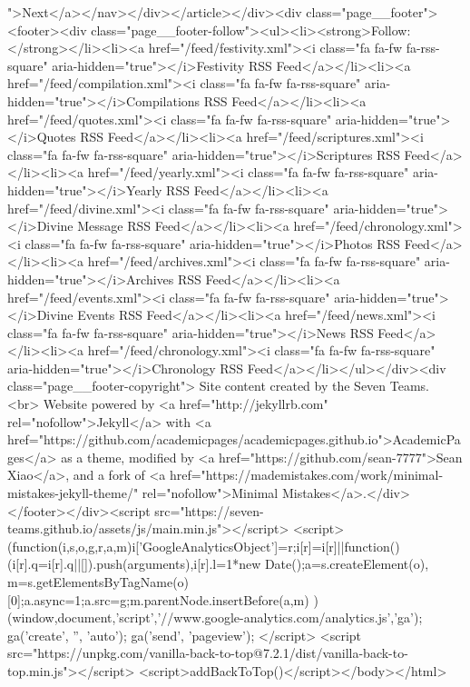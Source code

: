 ">Next</a></nav></div></article></div><div class="page__footer"><footer><div class="page__footer-follow"><ul><li><strong>Follow:</strong></li><li><a href="/feed/festivity.xml"><i class="fa fa-fw fa-rss-square" aria-hidden="true"></i>Festivity RSS Feed</a></li><li><a href="/feed/compilation.xml"><i class="fa fa-fw fa-rss-square" aria-hidden="true"></i>Compilations RSS Feed</a></li><li><a href="/feed/quotes.xml"><i class="fa fa-fw fa-rss-square" aria-hidden="true"></i>Quotes RSS Feed</a></li><li><a href="/feed/scriptures.xml"><i class="fa fa-fw fa-rss-square" aria-hidden="true"></i>Scriptures RSS Feed</a></li><li><a href="/feed/yearly.xml"><i class="fa fa-fw fa-rss-square" aria-hidden="true"></i>Yearly RSS Feed</a></li><li><a href="/feed/divine.xml"><i class="fa fa-fw fa-rss-square" aria-hidden="true"></i>Divine Message RSS Feed</a></li><li><a href="/feed/chronology.xml"><i class="fa fa-fw fa-rss-square" aria-hidden="true"></i>Photos RSS Feed</a></li><li><a href="/feed/archives.xml"><i class="fa fa-fw fa-rss-square" aria-hidden="true"></i>Archives RSS Feed</a></li><li><a href="/feed/events.xml"><i class="fa fa-fw fa-rss-square" aria-hidden="true"></i>Divine Events RSS Feed</a></li><li><a href="/feed/news.xml"><i class="fa fa-fw fa-rss-square" aria-hidden="true"></i>News RSS Feed</a></li><li><a href="/feed/chronology.xml"><i class="fa fa-fw fa-rss-square" aria-hidden="true"></i>Chronology RSS Feed</a></li></ul></div><div class="page__footer-copyright"> Site content created by the Seven Teams. <br> Website powered by <a href="http://jekyllrb.com" rel="nofollow">Jekyll</a> with <a href="https://github.com/academicpages/academicpages.github.io">AcademicPages</a> as a theme, modified by <a href="https://github.com/sean-7777">Sean Xiao</a>, and a fork of <a href="https://mademistakes.com/work/minimal-mistakes-jekyll-theme/" rel="nofollow">Minimal Mistakes</a>.</div></footer></div><script src="https://seven-teams.github.io/assets/js/main.min.js"></script> <script> (function(i,s,o,g,r,a,m){i['GoogleAnalyticsObject']=r;i[r]=i[r]||function(){ (i[r].q=i[r].q||[]).push(arguments)},i[r].l=1*new Date();a=s.createElement(o), m=s.getElementsByTagName(o)[0];a.async=1;a.src=g;m.parentNode.insertBefore(a,m) })(window,document,'script','//www.google-analytics.com/analytics.js','ga'); ga('create', '', 'auto'); ga('send', 'pageview'); </script> <script src="https://unpkg.com/vanilla-back-to-top@7.2.1/dist/vanilla-back-to-top.min.js"></script> <script>addBackToTop()</script></body></html>
